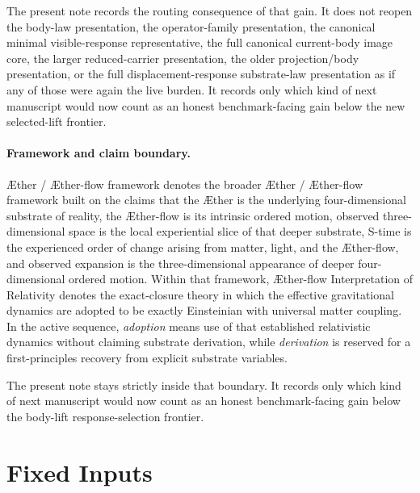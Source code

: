 \documentclass[11pt]{article}
\newcommand{\Aether}{\AE{}ther}
\newcommand{\Aflow}{\AE{}ther-flow}
\newcommand{\TheoryName}{\Aflow{} Interpretation of Relativity}
\newcommand{\TheoryProgram}{\Aether{} / \Aflow{} framework}
\begin{document}
The present note records the routing consequence of that gain. It does not reopen the body-law presentation, the operator-family presentation, the canonical minimal visible-response representative, the full canonical current-body image core, the larger reduced-carrier presentation, the older projection/body presentation, or the full displacement-response substrate-law presentation as if any of those were again the live burden. It records only which kind of next manuscript would now count as an honest benchmark-facing gain below the new selected-lift frontier.

\paragraph{Framework and claim boundary.}
\TheoryProgram{} denotes the broader \Aether{} / \Aflow{} framework built on the claims that the \Aether{} is the underlying four-dimensional substrate of reality, the \Aflow{} is its intrinsic ordered motion, observed three-dimensional space is the local experiential slice of that deeper substrate, S-time is the experienced order of change arising from matter, light, and the \Aflow{}, and observed expansion is the three-dimensional appearance of deeper four-dimensional ordered motion. Within that framework, \TheoryName{} denotes the exact-closure theory in which the effective gravitational dynamics are adopted to be exactly Einsteinian with universal matter coupling. In the active sequence, \emph{adoption} means use of that established relativistic dynamics without claiming substrate derivation, while \emph{derivation} is reserved for a first-principles recovery from explicit substrate variables.

The present note stays strictly inside that boundary. It records only which kind of next manuscript would now count as an honest benchmark-facing gain below the body-lift response-selection frontier.

\section{Fixed Inputs}
\end{document}
